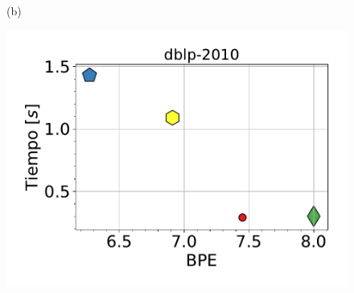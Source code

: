 \begin{figure}
\begin{minipage}{1\textwidth}
\begin{minipage}{0.45\textwidth}
    			(b)
    		\end{minipage}  		
    	\end{minipage}
    	
    	\begin{minipage}{1\textwidth}
    		\centering
    		\begin{minipage}{0.45\textwidth}
    			\centering
    			\begin{minipage}{0.75\textwidth}
    				\centering
    				\includegraphics[width=1\linewidth]{img/bpeTimes/secuencial/dblp-2010.pdf}
    			\end{minipage}
    			\begin{minipage}{0.2\textwidth}
    				\centering

\end{minipage}
\end{minipage}
\end{minipage}
\end{figure}
